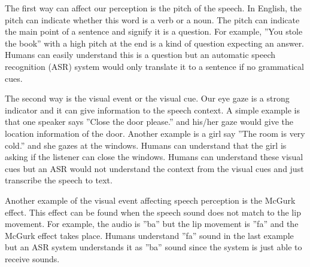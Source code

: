 \documentclass[12pt]{article}
\newenvironment{problem}[2][Problem]{\begin{trivlist}
\item[\hskip \labelsep {\bfseries #1}\hskip \labelsep {\bfseries #2.}]}{\end{trivlist}}
\begin{document}
\begin{problem}{1.3}
    The first way can affect our perception is the pitch of the speech. 
    In English, the pitch can indicate whether this word is a verb or a noun. 
    The pitch can indicate the main point of a sentence and signify it is a question. 
    For example, ”You stole the book” with a high pitch at the end is a kind of
    question expecting an answer. 
    Humans can easily understand this is a question but an automatic speech 
    recognition (ASR) system would only translate it to a sentence if no 
    grammatical cues. 
    
    The second way is the visual event or the visual cue. 
    Our eye gaze is a strong indicator and it can give information to the speech context. 
    A simple example is that one speaker says ”Close the door please.” and 
    his/her gaze would give the location information of the door. 
    Another example is a girl say ”The room is very cold.” and she gazes at the windows. 
    Humans can understand that the girl is asking if the listener can close the windows. 
    Humans can understand these visual cues but an ASR would not understand the 
    context from the visual cues and just transcribe the speech to text.

    Another example of the visual event affecting speech perception is the McGurk effect. 
    This effect can be found when the speech sound does not match to the lip movement. 
    For example, the audio is ”ba” but the lip movement is ”fa” and the McGurk effect 
    takes place. 
    Humans understand ”fa” sound in the last example but an ASR system understands
    it as ”ba” sound since the system is just able to receive sounds.
\end{problem}

\pagebreak
\end{document}
